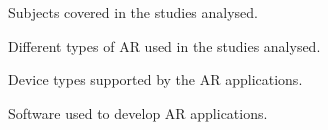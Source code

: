 \renewcommand{\floatpagefraction}{0.1}

% 	

\clearpage
\newpage


\clearpage
\newpage

\begin{figure}[t!]	
	\begin{center}
	
	\caption{Subjects covered in the studies analysed.}
	\label{fig:subjects}
    \end{center}
\end{figure}

\clearpage
\newpage

\begin{figure}[t!]	
	\begin{center}
	
	\caption{Different types of AR used in the studies analysed.}
	\label{fig:artech}
    \end{center}
\end{figure}

\clearpage
\newpage

\begin{figure}[t!]	
	\begin{center}
	
	\caption{Device types supported by the AR applications.}
	\label{fig:hardware}
    \end{center}
\end{figure}

\clearpage
\newpage

\begin{figure}[t!]	
	\begin{center}
	
	\caption{Software used to develop AR applications.}
	\label{fig:software}
    \end{center}
\end{figure}

